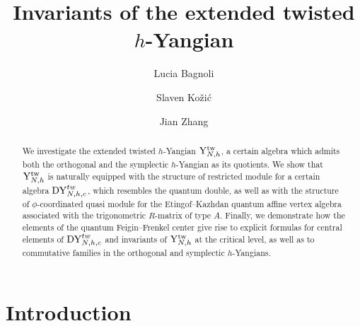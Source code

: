 \documentclass[12pt,a4paper,reqno]{amsart}
\theoremstyle{stil}
\theoremstyle{defi}
\theoremstyle{defi}
\theoremstyle{stil}
\theoremstyle{stil}
\theoremstyle{stil}
\theoremstyle{prim}
\begin{document}
\title{Invariants of the extended twisted  $h$-Yangian}

\author{Lucia Bagnoli}
\address[L. Bagnoli]{Dipartimento di Matematica, Sapienza Universit\`{a} di Roma, P.le Aldo Moro 5, 00185 Rome, Italy}

\author{Slaven Ko\v{z}i\'{c}}
\address[S. Ko\v{z}i\'{c}]{University of Zagreb Faculty of Science, Department of Mathematics, Bijeni\v{c}ka cesta 30, 10000 Zagreb, Croatia}

\author{Jian Zhang}
\address[J. Zhang]{School of Mathematics and Statistics, Central China Normal University,  Wuhan, Hubei 430079, China}
 

\begin{abstract}
We investigate the extended twisted $h$-Yangian ${\rm Y}_{N,h}^{\text{tw}}$, a certain algebra
which admits both the  orthogonal and the symplectic $h$-Yangian as its quotients.
We show that ${\rm Y}_{N,h}^{\text{tw}}$ is naturally equipped with the structure of restricted module  for a certain algebra ${\rm DY}_{N,h,c}^{tw}$, which resembles the quantum double, as well as   with the structure of
$\phi$-coordinated quasi module for the Etingof--Kazhdan quantum affine vertex algebra associated  with the trigonometric $R$-matrix of type $A$.
Finally, we demonstrate how the elements of the quantum Feigin--Frenkel center give rise to  explicit formulas for  
central elements of ${\rm DY}_{N,h,c}^{tw}$ and
 invariants of ${\rm Y}_{N,h}^{\text{tw}}$ at the critical level, as well as to commutative families in the  orthogonal and  symplectic $h$-Yangians.
\end{abstract}



 \maketitle
 

\allowdisplaybreaks
 
\section{Introduction}\label{intro}
\setcounter{equation}{0}
\end{document}
